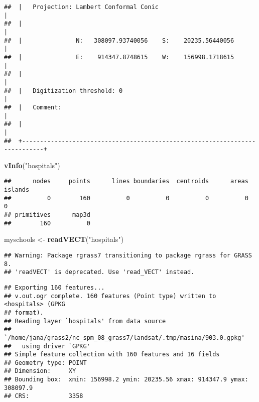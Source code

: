 \documentclass[]{article}
\newenvironment{Shaded}{\begin{snugshade}}{\end{snugshade}}
\newcommand{\KeywordTok}[1]{\textcolor[rgb]{0.13,0.29,0.53}{\textbf{#1}}}
\newcommand{\StringTok}[1]{\textcolor[rgb]{0.31,0.60,0.02}{#1}}
\newcommand{\NormalTok}[1]{#1}
\begin{document}
\begin{verbatim}
##  |   Projection: Lambert Conformal Conic                                      |
##  |                                                                            |
##  |               N:   308097.93740056    S:    20235.56440056                 |
##  |               E:    914347.8748615    W:    156998.1718615                 |
##  |                                                                            |
##  |   Digitization threshold: 0                                                |
##  |   Comment:                                                                 |
##  |                                                                            |
##  +----------------------------------------------------------------------------+
\end{verbatim}

\begin{Shaded}
\begin{Highlighting}[]
\KeywordTok{vInfo}\NormalTok{(}\StringTok{"hospitals"}\NormalTok{)}
\end{Highlighting}
\end{Shaded}

\begin{verbatim}
##      nodes     points      lines boundaries  centroids      areas    islands 
##          0        160          0          0          0          0          0 
## primitives      map3d 
##        160          0
\end{verbatim}

\begin{Shaded}
\begin{Highlighting}[]
\NormalTok{myschools <-}\StringTok{ }\KeywordTok{readVECT}\NormalTok{(}\StringTok{"hospitals"}\NormalTok{)}
\end{Highlighting}
\end{Shaded}

\begin{verbatim}
## Warning: Package rgrass7 transitioning to package rgrass for GRASS 8.
## 'readVECT' is deprecated. Use 'read_VECT' instead.
\end{verbatim}

\begin{verbatim}
## Exporting 160 features...
## v.out.ogr complete. 160 features (Point type) written to <hospitals> (GPKG
## format).
## Reading layer `hospitals' from data source 
##   `/home/jana/grass2/nc_spm_08_grass7/landsat/.tmp/masina/903.0.gpkg' 
##   using driver `GPKG'
## Simple feature collection with 160 features and 16 fields
## Geometry type: POINT
## Dimension:     XY
## Bounding box:  xmin: 156998.2 ymin: 20235.56 xmax: 914347.9 ymax: 308097.9
## CRS:           3358
\end{verbatim}
\end{document}
